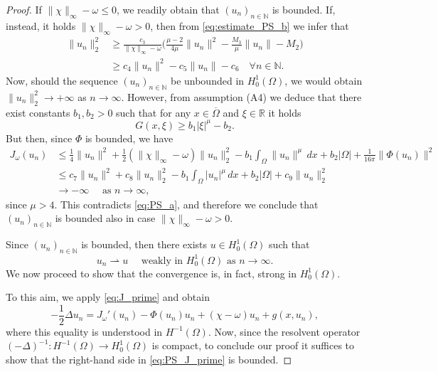 \documentclass[reqno]{amsart}
\begin{document}
\begin{proof}
If $\|\chi\|_\infty - \omega \leq 0$, we readily obtain that $(u_n)_{n \in \mathbb N}$ 
is bounded. If, instead, it holds $\|\chi\|_\infty - \omega > 0$, then from 
\eqref{eq:estimate_PS_b} we infer that
 \begin{align*}
 \|u_n\|_2^2
 & \geq \frac{c_3}{\|\chi\|_\infty - \omega} 
  \Big( \frac{\mu - 2}{4\mu}\|u_n\|^2 - \frac{M_3}{\mu}\|u_n\| - M_2 \Big)  \\
 & \geq c_4 \|u_n\|^2 - c_5\|u_n\| - c_6 \quad \forall n \in \mathbb N.
 \end{align*}
Now, should the sequence $(u_n)_{n \in \mathbb N}$ be unbounded in $H_0^1(\Omega)$, 
we would obtain $\|u_n\|_2^2 \to + \infty$ as $n \to \infty$. 
However, from assumption (A4) we deduce that there exist constants $b_1, b_2 > 0$ 
such that for any $x \in \overline \Omega$ and $\xi \in \mathbb R$ it holds
 \[
 G(x, \xi) \geq b_1 |\xi|^\mu - b_2.
 \]
But then, since $\Phi$ is bounded, we have
 \begin{align*}
 J_\omega(u_n)
& \leq \frac{1}{4}\|u_n\|^2 + \frac{1}{2}(\|\chi\|_\infty 
 - \omega) \|u_n\|_2^2 - b_1 \int_\Omega \|u_n\|^\mu \,dx 
 + b_2 |\Omega| + \frac{1}{16\pi}\|\Phi(u_n)\|^2  \\
& \leq c_7\|u_n\|^2 + c_8 \|u_n\|_2^2 - b_1 \int_\Omega |u_n|^\mu \,dx 
 + b_2|\Omega| + c_9\|u_n\|_2^2  \\
& \to - \infty \quad \text{ as } n \to \infty,
\end{align*}
since $\mu > 4$. This contradicts \eqref{eq:PS_a}, and therefore we conclude that 
$(u_n)_{n \in \mathbb N}$ is bounded also in case $\|\chi\|_\infty - \omega > 0$.

Since $(u_n)_{n \in \mathbb N}$ is bounded, then there exists $u \in H_0^1(\Omega)$ 
such that
 \[
 u_n \rightharpoonup u \quad \text{ weakly in } H_0^1(\Omega) \text{ as } n \to \infty.
 \]
We now proceed to show that the convergence is, in fact, strong in $H_0^1(\Omega)$.

To this aim, we apply \eqref{eq:J_prime} and obtain
\begin{equation}
 \label{eq:PS_J_prime}
 - \frac{1}{2} \Delta u_n = J_\omega'(u_n) - \Phi(u_n)u_n + (\chi - \omega) u_n + g(x, u_n),
\end{equation}
where this equality is understood in $H^{-1}(\Omega)$. Now, since the resolvent operator 
$(- \Delta)^{-1}: H^{-1}(\Omega) \to H_0^1(\Omega)$ is compact, to conclude our proof 
it suffices to show that the right-hand side in \eqref{eq:PS_J_prime} is bounded.


\end{proof}
\end{document}
